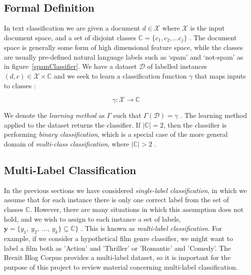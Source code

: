 \documentclass[Dissertation.tex]{subfiles}
\begin{document}
\subsection{Formal Definition}
In text classification we are given a document $ d \in \mathcal{X}$ where $ \mathcal{X} $ is the input document space, and  a set of disjoint classes $ \mathbb{C} = \{c_1,c_2,\dots c_j\}$  \cite{manningIntroductionInformationRetrieval2009}. The document space is generally some form of high dimensional feature space, while the classes are usually pre-defined natural language labels such as `spam' and `not-spam' as in figure~\ref{spamClassifier}\cite{manningIntroductionInformationRetrieval2009}. We have a dataset $\mathcal{D}$ of labelled instances $(d,c) \in \mathcal{X}\times \mathbb{C}$ and we seek to learn a classification function $ \gamma $ that maps inputs to classes \cite{manningIntroductionInformationRetrieval2009}:

$$
\gamma: \mathcal{X}\rightarrow \mathbb{C}
$$

We denote the \textit{learning method} as $ \Gamma $ such that $ \Gamma(\mathcal{D})= \gamma $ \cite{manningIntroductionInformationRetrieval2009}. The learning method applied to the dataset returns the classifier.  If $ |\mathbb{C}| = 2 $, then the classifier is performing \textit{binary classification}, which is a special case of the more general domain of \textit{multi-class classification}, where $ |\mathbb{C}| > 2 $ \cite{manningIntroductionInformationRetrieval2009}.


\subsection{Multi-Label Classification}\label{sec:multiLabel}
In the previous sections we have considered \textit{single-label classification}, in which we assume  that for each instance there is only one correct label from the set of classes $ \mathbb{C} $. However, there are many situations in which this assumption does not hold, and we wish to assign to each instance a set of labels, $ \mathbf{y} = \{y_1,\ y_2,\  \dots, \ y_k\} \subseteq \mathbb{C}\} $ \cite{tsoumakasMiningMultilabelData2009}. This is known as \textit{multi-label classification}. For example, if we consider a hypothetical film genre classifier, we might want to label a film both as 'Action' and 'Thriller' or 'Romantic' and 'Comedy'. The Brexit Blog Corpus \cite{simakiAnnotatingSpeakerStance2017} provides a multi-label dataset, so it is important for the purpose of this project to review material concerning multi-label classification.
\end{document}
